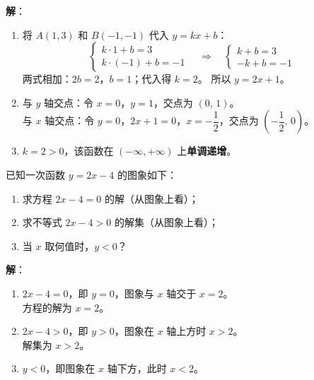 \documentclass[12pt, a4paper]{ctexart}
\begin{document}
\textbf{解}：
\begin{enumerate}[label=(\arabic*)]
  \item 将 $A(1,3)$ 和 $B(-1,-1)$ 代入 $y = kx + b$：
        \[
          \begin{cases} k \cdot 1 + b = 3 \\ k \cdot (-1) + b = -1 \end{cases}
          \quad\Rightarrow\quad
          \begin{cases} k + b = 3 \\ -k + b = -1 \end{cases}
        \]
        两式相加：$2b = 2$，$b = 1$；代入得 $k = 2$。
        所以 $y = 2x + 1$。
  \item 与 $y$ 轴交点：令 $x=0$，$y=1$，交点为 $(0,\,1)$。\\
        与 $x$ 轴交点：令 $y=0$，$2x+1=0$，$x=-\dfrac{1}{2}$，交点为 $\left(-\dfrac{1}{2},\,0\right)$。
  \item $k = 2 > 0$，该函数在 $(-\infty, +\infty)$ 上\textbf{单调递增}。
\end{enumerate}

\begin{examplebox}
已知一次函数 $y = 2x - 4$ 的图象如下：
\begin{center}
\end{center}
\begin{enumerate}[label=(\arabic*)]
  \item 求方程 $2x - 4 = 0$ 的解（从图象上看）；
  \item 求不等式 $2x - 4 > 0$ 的解集（从图象上看）；
  \item 当 $x$ 取何值时，$y < 0$？
\end{enumerate}
\end{examplebox}

\textbf{解}：
\begin{enumerate}[label=(\arabic*)]
  \item $2x - 4 = 0$，即 $y = 0$，图象与 $x$ 轴交于 $x=2$。\\
        方程的解为 $x = 2$。
  \item $2x - 4 > 0$，即 $y > 0$，图象在 $x$ 轴上方时 $x > 2$。\\
        解集为 $x > 2$。
  \item $y < 0$，即图象在 $x$ 轴下方，此时 $x < 2$。
\end{enumerate}
\end{document}
